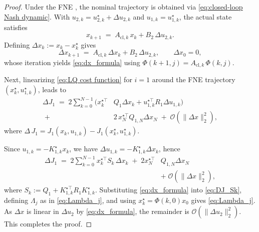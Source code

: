 \documentclass[10pt,a4paper]{amsart}
\begin{document}
\begin{proof}
Under the FNE
, the nominal trajectory is obtained via \eqref{eq:closed-loop Nash dynamic}. With $u_{2,k}=u_{2,k}^\star+\Delta u_{2,k}$ and $u_{1,k}=u_{1,k}^\star$, the actual state satisfies
\begin{equation*}
x_{k+1} \;=\; A_{\text{cl},k} \, x_k + B_2 \, \Delta u_{2,k}.
\end{equation*}
Defining $\Delta x_k := x_k - x_k^\star$ gives
\begin{equation*}\label{eq:dx_recursion}
\Delta x_{k+1} \;=\; A_{\text{cl},k} \, \Delta x_k + B_2 \, \Delta u_{2,k}, \qquad \Delta x_0 = 0,
\end{equation*}
whose iteration yields \eqref{eq:dx_formula} using $\Phi(k+1,j)=A_{\text{cl},k}\,\Phi(k,j)$.

Next, linearizing \eqref{eq:LQ cost function} for $i=1$ around the FNE trajectory $(x_k^\star,u_{1,k}^\star)$, leads to
\begin{equation*}\label{eq:DJ_raw}
\begin{aligned}
    \Delta J_1 \;=\; 2 \sum_{k=0}^{N-1} \big( x_k^{\star\top}& Q_1 \Delta x_k + u_{1,k}^{\star\top} R_1 \Delta u_{1,k} \big)\\
    \;+\; &2 \, x_N^{\star\top} Q_{1,N} \Delta x_N \;+\; \mathcal{O}(\|\Delta x\|_2^2),
\end{aligned}
\end{equation*}
where $\Delta\,J_1 = J_1(x_k,u_{1,k})-J_1(x_k^\star,u_{1,k}^\star)$.

Since $u_{1,k}=-K^\star_{1,k}x_k$, we have $\Delta u_{1,k} = -K^\star_{1,k}\Delta x_k$, hence
\begin{equation}\label{eq:DJ_Sk}
\begin{aligned}
    \Delta J_1 \;=\; 2 \sum_{k=0}^{N-1} x_k^{\star\top} S_k \, \Delta x_k
\;+\; 2 x_N^{\star\top}& Q_{1,N} \Delta x_N \\
\;&+\; \mathcal{O}(\|\Delta x\|_2^2),
\end{aligned}
\end{equation}
where $S_k := Q_1 + K_{1,k}^{\star\top} R_1 K^\star_{1,k}$. Substituting \eqref{eq:dx_formula} into \eqref{eq:DJ_Sk}, defining $\Lambda_j$ as in \eqref{eq:Lambda_j}, and using $x_k^\star=\Phi(k,0)x_0$ gives \eqref{eq:Lambda_j}. As $\Delta x$ is linear in $\Delta u_2$ by \eqref{eq:dx_formula}, the remainder is $\mathcal{O}(\|\Delta u_2\|_2^2)$. This completes the proof.
\end{proof}
\end{document}
